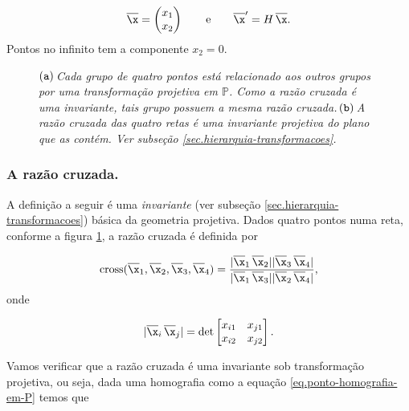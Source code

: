\begin{equation}\label{eq.ponto-homografia-em-P}
\overline{\x}=
\begin{pmatrix}
x_1\\
x_2
\end{pmatrix}
\qquad\text{e}\qquad
\overline{\x}'=H\,\overline{\x}.
\end{equation}
Pontos no infinito tem a componente $x_2=0$.

\begin{figure}[!htb]
\centering
{}
\quad
{}
\caption{$({\tt a})\,$\textit{Cada grupo de quatro pontos está relacionado aos outros grupos por uma transformação projetiva em ${\mathbb{P}}$. Como a razão cruzada é uma invariante, tais grupo possuem a mesma razão cruzada.}$\,({\tt b})\,$\textit{A razão cruzada das quatro retas é uma invariante projetiva do plano que as contém. Ver subseção \ref{sec.hierarquia-transformacoes}.}}
\label{fig.razao-cruzada}
\end{figure}

\subsubsection*{A razão cruzada.}
A definição a seguir é uma \textit{invariante} (ver subseção \ref{sec.hierarquia-transformacoes}) básica da geometria projetiva. Dados quatro pontos numa reta, conforme a figura \ref{fig.razao-cruzada}, a razão cruzada é definida por 

\begin{equation*}
\text{cross}(\overline{\x}_1,\overline{\x}_2,\overline{\x}_3,\overline{\x}_4)=\frac{|\overline{\x}_1\,\overline{\x}_2||\overline{\x}_3\,\overline{\x}_4|}{|\overline{\x}_1\,\overline{\x}_3||\overline{\x}_2\,\overline{\x}_4|},
\end{equation*}
onde 

\begin{equation*}
|\overline{\x}_i\,\overline{\x}_j|=
\text{det}
\begin{bmatrix}
x_{i1}&x_{j1}\\
x_{i2}&x_{j2}
\end{bmatrix}.
\end{equation*}

Vamos verificar que a razão cruzada é uma invariante sob transformação projetiva, ou seja, dada uma homografia como a equação \ref{eq.ponto-homografia-em-P} temos que 

